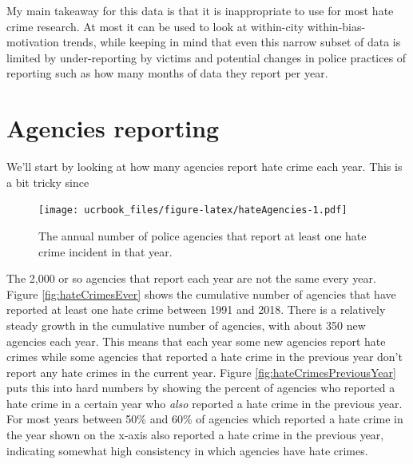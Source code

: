\documentclass[
  12pt,
  openany]{book}
\begin{document}
My main takeaway for this data is that it is inappropriate to use for most hate crime research. At most it can be used to look at within-city within-bias-motivation trends, while keeping in mind that even this narrow subset of data is limited by under-reporting by victims and potential changes in police practices of reporting such as how many months of data they report per year.

\hypertarget{agencies-reporting-1}{%
\section{Agencies reporting}\label{agencies-reporting-1}}

We'll start by looking at how many agencies report hate crime each year. This is a bit tricky since

\begin{figure}
\centering
\texttt{[image: ucrbook\_files/figure-latex/hateAgencies-1.pdf]}
\caption{\label{fig:hateAgencies}The annual number of police agencies that report at least one hate crime incident in that year.}
\end{figure}

The 2,000 or so agencies that report each year are not the same every year. Figure \ref{fig:hateCrimesEver} shows the cumulative number of agencies that have reported at least one hate crime between 1991 and 2018. There is a relatively steady growth in the cumulative number of agencies, with about 350 new agencies each year. This means that each year some new agencies report hate crimes while some agencies that reported a hate crime in the previous year don't report any hate crimes in the current year. Figure \ref{fig:hateCrimesPreviousYear} puts this into hard numbers by showing the percent of agencies who reported a hate crime in a certain year who \emph{also} reported a hate crime in the previous year. For most years between 50\% and 60\% of agencies which reported a hate crime in the year shown on the x-axis also reported a hate crime in the previous year, indicating somewhat high consistency in which agencies have hate crimes.
\end{document}
